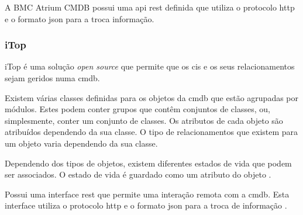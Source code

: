 \documentclass[
  oneside,
  11pt, a4paper,
  footinclude=true,
  headinclude=true,
  cleardoublepage=empty
]{scrbook}
\begin{document}
    A BMC Atrium CMDB \cite{bmcatrium} possui uma \gls{api} \gls{rest} definida que utiliza o protocolo \gls{http} e o formato \gls{json} para a troca informação.
    
\subsubsection{\textbf{iTop}}
    
    iTop \cite{itop} é uma solução \textit{open source} que permite que os \glspl{ci} e os seus relacionamentos sejam geridos numa \gls{cmdb}. 
    
    Existem várias classes definidas para os objetos da \gls{cmdb} que estão agrupadas por módulos. Estes podem conter grupos que contêm conjuntos de classes, ou, simplesmente, conter um conjunto de classes. Os atributos de cada objeto são atribuídos dependendo da sua classe. O tipo de relacionamentos que existem para um objeto varia dependendo da sua classe.
    
    Dependendo dos tipos de objetos, existem diferentes estados de vida que podem ser associados. O estado de vida é guardado como um atributo do objeto \cite{itopdocumentation}.
    
    Possui uma interface \gls{rest} que permite uma interação remota com a \gls{cmdb}. Esta interface utiliza o protocolo \gls{http} e o formato \gls{json} para a troca de informação \cite{itopdocumentation}.
    

    
    
\end{document}
